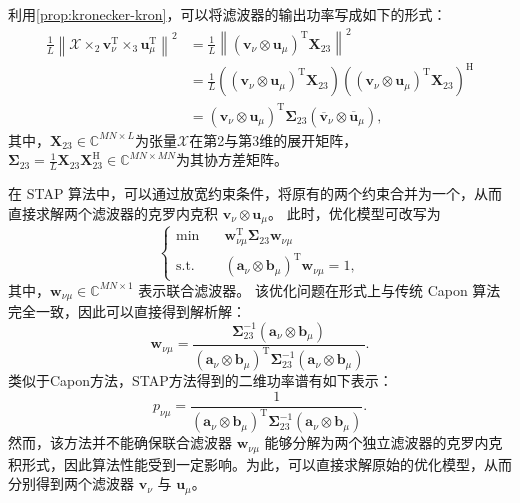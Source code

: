 利用\cref{prop:kronecker-kron}，可以将滤波器的输出功率写成如下的形式：
\[
    \begin{split}
        \frac{1}{L} \left\| \mathcal{X} \times_2 \bm{v}_{\nu}^{\mathrm{T}} \times_3 \bm{u}_{\mu}^{\mathrm{T}} \right\|^2
        & = \frac{1}{L} \left\| (\bm{v}_{\nu} \otimes \bm{u}_{\mu})^{\mathrm{T}} \mathbf{X}_{23}  \right\|^2 \\
        & = \frac{1}{L}  ((\bm{v}_{\nu} \otimes \bm{u}_{\mu})^{\mathrm{T}} \mathbf{X}_{23}) \left((\bm{v}_{\nu} \otimes \bm{u}_{\mu})^{\mathrm{T}} \mathbf{X}_{23}\right)^{\mathrm{H}} \\
        & = (\bm{v}_{\nu} \otimes \bm{u}_{\mu})^{\mathrm{T}} \mathbf{\Sigma}_{23} (\overline{\bm{v}}_{\nu} \otimes \overline{\bm{u}}_{\mu}),
    \end{split}
\]
其中，\( \mathbf{X}_{23} \in \mathbb{C}^{MN \times L} \)为张量\( \mathcal{X} \)在第2与第3维的展开矩阵，\( \mathbf{\Sigma}_{23} = \frac{1}{L} \mathbf{X}_{23} \mathbf{X}_{23}^{\mathrm{H}} \in \mathbb{C}^{MN \times MN} \)为其协方差矩阵。

在 STAP 算法中，可以通过放宽约束条件，将原有的两个约束合并为一个，从而直接求解两个滤波器的克罗内克积 \( \bm{v}_{\nu} \otimes \bm{u}_{\mu} \)。
此时，优化模型可改写为
\begin{equation}
    \begin{cases}
        \min \quad        & \bm{w}_{\nu\mu}^{\mathrm{T}} \mathbf{\Sigma}_{23} \bm{w}_{\nu\mu} \\
        \text{s.t.} \quad & (\bm{a}_{\nu} \otimes \bm{b}_{\mu})^{\mathrm{T}} \bm{w}_{\nu\mu} = 1 ,
    \end{cases}
\end{equation}
其中，\( \bm{w}_{\nu\mu} \in \mathbb{C}^{MN \times 1} \) 表示联合滤波器。
该优化问题在形式上与传统 Capon 算法完全一致，因此可以直接得到解析解：
\begin{equation}
    \bm{w}_{\nu\mu}
    = \frac{\mathbf{\Sigma}_{23}^{-1} (\bm{a}_{\nu} \otimes \bm{b}_{\mu})}
    {(\bm{a}_{\nu} \otimes \bm{b}_{\mu})^{\mathrm{T}} \mathbf{\Sigma}_{23}^{-1} (\bm{a}_{\nu} \otimes \bm{b}_{\mu})}.
\end{equation}
类似于Capon方法，STAP方法得到的二维功率谱有如下表示：
\[
    p_{\nu\mu} =\frac{1}{(\bm{a}_{\nu} \otimes \bm{b}_{\mu})^{\mathrm{T}} \mathbf{\Sigma}_{23}^{-1} (\bm{a}_{\nu} \otimes \bm{b}_{\mu})}.
\]
然而，该方法并不能确保联合滤波器 \( \bm{w}_{\nu\mu} \) 能够分解为两个独立滤波器的克罗内克积形式，因此算法性能受到一定影响。为此，可以直接求解原始的优化模型，从而分别得到两个滤波器 \( \bm{v}_{\nu} \) 与 \( \bm{u}_{\mu} \)。

